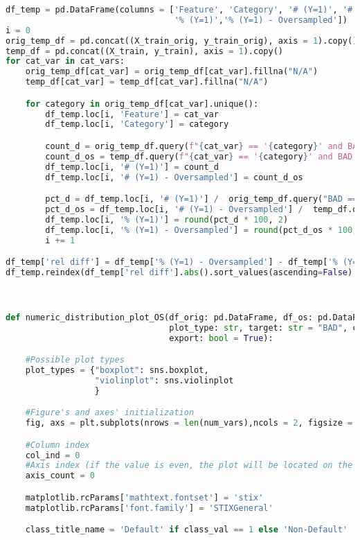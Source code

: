 \begin{lstlisting}[language=Python, basicstyle=\footnotesize\ttfamily]
df_temp = pd.DataFrame(columns = ['Feature', 'Category', '# (Y=1)', '# (Y=1) - Oversampled',
                                  '% (Y=1)','% (Y=1) - Oversampled'])
i = 0
orig_temp_df = pd.concat((X_train_orig, y_train_orig), axis = 1).copy()
temp_df = pd.concat((X_train, y_train), axis = 1).copy()
for cat_var in cat_vars:
    orig_temp_df[cat_var] = orig_temp_df[cat_var].fillna("N/A")
    temp_df[cat_var] = temp_df[cat_var].fillna("N/A")

    for category in orig_temp_df[cat_var].unique():
        df_temp.loc[i, 'Feature'] = cat_var
        df_temp.loc[i, 'Category'] = category

        count_d = orig_temp_df.query(f"{cat_var} == '{category}' and BAD == 1").shape[0]
        count_d_os = temp_df.query(f"{cat_var} == '{category}' and BAD == 1").shape[0]
        df_temp.loc[i, '# (Y=1)'] = count_d
        df_temp.loc[i, '# (Y=1) - Oversampled'] = count_d_os

        pct_d = df_temp.loc[i, '# (Y=1)'] /  orig_temp_df.query("BAD == 1").shape[0]
        pct_d_os = df_temp.loc[i, '# (Y=1) - Oversampled'] /  temp_df.query("BAD == 1").shape[0]
        df_temp.loc[i, '% (Y=1)'] = round(pct_d * 100, 2)
        df_temp.loc[i, '% (Y=1) - Oversampled'] = round(pct_d_os * 100, 2)
        i += 1

df_temp['rel diff'] = df_temp['% (Y=1) - Oversampled'] - df_temp['% (Y=1)']
df_temp.reindex(df_temp['rel diff'].abs().sort_values(ascending=False).index)



def numeric_distribution_plot_OS(df_orig: pd.DataFrame, df_os: pd.DataFrame, num_vars: list,
                                 plot_type: str, target: str = "BAD", class_val = 1,
                                 export: bool = True):

    #Possible plot types
    plot_types = {"boxplot": sns.boxplot,
                  "violinplot": sns.violinplot
                  }

    #Figure's and axes' initialization
    fig, axs = plt.subplots(nrows = len(num_vars),ncols = 2, figsize = (11, 45))

    #Column index
    col_ind = 0
    #Axis index (if the value is even, the plot will be located on the left side, otherwise on the right side)
    axis_count = 0

    matplotlib.rcParams['mathtext.fontset'] = 'stix'
    matplotlib.rcParams['font.family'] = 'STIXGeneral'

    class_title_name = 'Default' if class_val == 1 else 'Non-Default'


\end{lstlisting}

